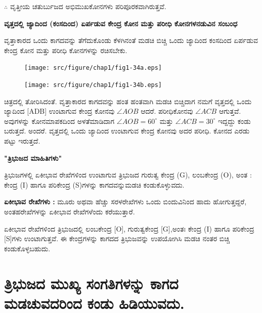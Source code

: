  $\therefore$ ವೃತ್ತೀಯ ಚತುರ್ಬುಜದ ಅಭಿಮುಖಕೋನಗಳು ಪರಿಪೂರಕವಾಗಿರುತ್ತವೆ. 
  
 \noindent
 \textbf{ವೃತ್ತದಲ್ಲಿ ಜ್ಯಾದಿಂದ (ಕಂಸದಿಂದ) ಏರ್ಪಡುವ ಕೇಂದ್ರ ಕೋನ ಮತ್ತು ಪರೀಧಿ ಕೋನಗಳ\break ನಡುವಿನ ಸಂಬಂಧ}
 
ವೃತ್ತಾಕಾರದ ಒಂದು ಕಾಗದವನ್ನು ತೆಗೆದುಕೊಂಡು ಕೆಳಗಿನಂತೆ ಮಡಚಿ ಬಿಚ್ಚಿ ಒಂದು ಜ್ಯಾದಿಂದ ಕಂಸದಿಂದ ಏರ್ಪಡುವ ಕೇಂದ್ರ ಕೋನ ಮತ್ತು ಪರೀಧಿ ಕೋನಗಳನ್ನು ರಚಿಸಬೇಕು. 
\begin{figure}[H]
\centering
\texttt{[image: src/figure/chap1/fig1-34a.eps]}
\end{figure}
    \begin{figure}[H]
\centering
\texttt{[image: src/figure/chap1/fig1-34b.eps]}
\end{figure}
 
 ಚಿತ್ರದಲ್ಲಿ ತೋರಿಸಿದಂತೆ. ವೃತ್ತಾಕಾರದ ಕಾಗದವನ್ನು ಹಂತ ಹಂತವಾಗಿ ಮಡಚಿ ಬಿಚ್ಚಿ\break ದಾಗ ನಮಗೆ ವೃತ್ತದಲ್ಲಿ ಒಂದು ಜ್ಯಾದಿಂದ [ADB] ಉಂಟಾಗುವ ಕೇಂದ್ರ ಕೋನವು $\angle AOB$  ಆದರೆ. ಪರೀಧಿಕೋನವು $\angle ACB$ ಆಗುತ್ತವೆ. ಅವುಗಳನ್ನು ಕೋನಮಾಪಕದಿಂದ ಅಳತೆಮಾಡಿದಾಗ $\angle AOB = 60^\circ$ ಮತ್ತು $\angle ACB = 30^\circ$ ಇದ್ದದ್ದು ಕಂಡು ಬರುತ್ತದೆ. ಅಂದರೆ. ವೃತ್ತದಲ್ಲಿ ಒಂದು ಜ್ಯಾದಿಂದ ಉಂಟಾಗುವ ಕೇಂದ್ರ ಕೋನವು ಅದರ ಪರೀಧಿ. ಕೋನದ ಎರಡು ಪಟ್ಟು ಇರುತ್ತದೆ. 
 
 \smallskip
 \noindent
  \textbf{"ತ್ರಿಭುಜದ ಮಾಹಿತಿಗಳು"}
  
  ತ್ರಿಭುಜಗಳಲ್ಲಿ ಏಕೀಭಾವ ರೇಖೆಗಳಿಂದ ಉಂಟಾಗುವ ತ್ರಿಭುಜದ ಗುರುತ್ವ ಕೇಂದ್ರ (G), ಲಂಬಕೇಂದ್ರ  (O), ಅಂತ : ಕೇಂದ್ರ (I) ಹಾಗೂ  ಪರಿಕೇಂದ್ರ (S)ಗಳನ್ನು ಕಾಗದವನ್ನು\break ಮಡಚಿ ಕಂಡುಕೊಳ್ಳುವದು. 
  
  \noindent
    \textbf{ಏಕೀಭಾವ ರೇಖೆಗಳು :} ಮೂರು ಅಥವಾ ಹೆಚ್ಚು ಸರಳರೇಖೆಗಳು ಒಂದು ಬಿಂದುವಿನಿಂದ ಹಾದು ಹೋಗುತ್ತದ್ದರೆ, ಅಂತಹರೇಖೆಗಳನ್ನು ಏಕೀಭಾವ ರೇಖೆಗಳೆಂದು ಕರೆಯುತ್ತಾರೆ. 
    
    ಏಕೀಭಾವ ರೇಖೆಗಳಿಂದ ತ್ರಿಭುಜದಲ್ಲಿ ಲಂಬಕೇಂದ್ರ [O], ಗುರುತ್ವಕೇಂದ್ರ  [G],\break ಅಂತಃ ಕೇಂದ್ರ  (I) ಹಾಗೂ ಪರಿಕೇಂದ್ರ [S]ಗಳು ಉಂಟಾಗುತ್ತವೆ. ಈ ಕೇಂದ್ರಗಳನ್ನು ಕಾಗದದ ತ್ರಿಭುಜವನ್ನು ಉಪಯೋಗಿಸಿ ಮಡಚಿ ನಂತರ ಬಿಚ್ಚಿ ಕಂಡುಕೊಳ್ಳಬಹುದು. 

\section{ತ್ರಿಭುಜದ ಮುಖ್ಯ ಸಂಗತಿಗಳನ್ನು ಕಾಗದ ಮಡಚುವದರಿಂದ ಕಂಡು ಹಿಡಿಯುವದು. }\label{sec1.13}%
      
